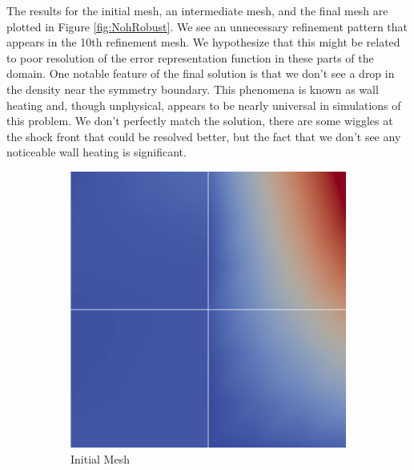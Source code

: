 \documentclass[Dissertation.tex]{subfiles}
\begin{document}
The results for the initial mesh, an intermediate mesh, and the final mesh are plotted 
in Figure \ref{fig:NohRobust}. 
We see an unnecessary refinement pattern that appears in the 10th refinement mesh.
We hypothesize that this might be related to poor resolution of the error representation function
in these parts of the domain.
One notable feature of the final solution is that we don't see a drop in the density near the symmetry boundary.
This phenomena is known as wall heating and, though unphysical, appears to be nearly 
universal in simulations of this problem.
We don't perfectly match the solution, there are some wiggles at the shock front that could be resolved
better, but the fact that we don't see any noticeable wall heating is significant.


\begin{figure}[ht]
\centering
\begin{subfigure}[t]{0.32\textwidth}
\centering
\includegraphics[width=\textwidth]{Dissertation/Noh/Robust-mesh0.png}
\caption{Initial Mesh}
\end{subfigure}
\begin{subfigure}[t]{0.32\textwidth}
\centering

\end{subfigure}
\end{figure}
\end{document}
